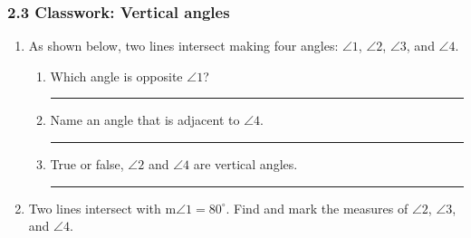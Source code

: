 

\fancyhead[LE]{\thepage}



\subsubsection*{2.3 Classwork: Vertical angles}
\begin{enumerate}
\item As shown below, two lines intersect making four angles: $\angle 1$, $\angle 2$, $\angle 3$, and $\angle 4$.
  \begin{center}
  \end{center}
  \begin{enumerate}
    \item Which angle is opposite $\angle 1$? \rule{4cm}{0.15mm} \bigskip
    \item Name an angle that is adjacent to $\angle 4$. \rule{4cm}{0.15mm} \bigskip
    \item True or false, $\angle 2$ and $\angle 4$ are vertical angles. \rule{3cm}{0.15mm}
  \end{enumerate}

\item Two lines intersect with m$\angle 1=80^\circ$. Find and mark the measures of $\angle 2$, $\angle 3$, and $\angle 4$.
  \begin{flushleft}
  \end{flushleft}


\end{enumerate}

